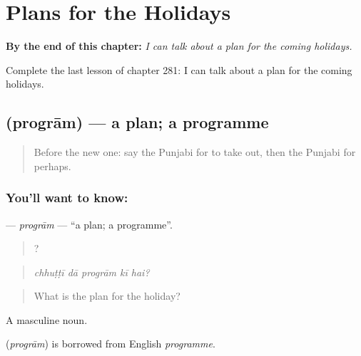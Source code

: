 
\chapter{Plans for the Holidays}
\label{ch:pa-a2-plans-for-the-holidays}

\begin{chapteropening}
\textbf{By the end of this chapter:} \emph{I can talk about a plan for the coming holidays.}

Complete the last lesson of chapter 281: I can talk about a plan for the coming holidays.
\end{chapteropening}

\section[\texorpdfstring{\pa{ਪ੍ਰੋਗਰਾਮ} (progrām)}{ਪ੍ਰੋਗਰਾਮ (progrām)}]{ (progrām) — a plan; a programme}

\label{lesson:PA-C281-program}



\begin{quote}
Before the new one: say the Punjabi for to take out, then the Punjabi for perhaps.
\end{quote}

\subsection*{You'll want to know: }
\textbf{} — \emph{progrām} — \textquotedblleft{}a plan; a programme\textquotedblright{}.

\begin{quote}
    ?
\end{quote}

\begin{quote}
\emph{chhuṭṭī dā progrām kī hai?}
\end{quote}

\begin{quote}
What is the plan for the holiday?
\end{quote}

A masculine noun.

\begin{cousinweb}
\textbf{} (\emph{progrām}) is borrowed from English \emph{programme}.
\end{cousinweb}

